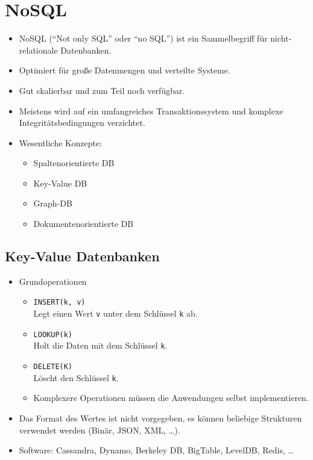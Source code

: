\documentclass[a4paper, 11pt, accentcolor = tud3b]{tudreport}
\begin{document}
        \section{NoSQL} %
            \begin{itemize}
            	\item NoSQL (\enquote{Not only SQL} oder \enquote{no SQL}) ist ein Sammelbegriff für nicht-relationale Datenbanken.
            	\item Optimiert für große Datenmengen und verteilte Systeme.
            	\item Gut skalierbar und zum Teil noch verfügbar.
            	\item Meistens wird auf ein umfangreiches Transaktionssystem und komplexe Integritätsbedingungen verzichtet.
            	\item Wesentliche Konzepte:
            		\begin{itemize}
            			\item Spaltenorientierte DB
            			\item Key-Value DB
            			\item Graph-DB
            			\item Dokumentenorientierte DB
            		\end{itemize}
            \end{itemize}

            \subsection{Key-Value Datenbanken} %
                \begin{itemize}
                	\item Grundoperationen
                		\begin{itemize}
                			\item \texttt{INSERT(k, v)} \\ Legt einen Wert \texttt{v} unter dem Schlüssel \texttt{k} ab.
                			\item \texttt{LOOKUP(k)} \\ Holt die Daten mit dem Schlüssel \texttt{k}.
                			\item \texttt{DELETE(K)} \\ Löscht den Schlüssel \texttt{k}.
                			\item Komplexere Operationen müssen die Anwendungen selbst implementieren.
                		\end{itemize}
                	\item Das Format des Wertes ist nicht vorgegeben, es können beliebige Strukturen verwendet werden (Binär, JSON, XML, \dots).
                	\item Software: Cassandra, Dynamo, Berkeley DB, BigTable, LevelDB, Redis, \dots
                \end{itemize}
\end{document}
